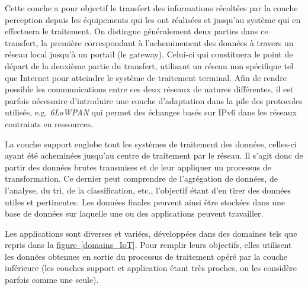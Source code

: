 \documentclass[]{article}
\newcommand{\minit}[1]{\noindent{\small\textbf{ \underline{#1}}}\vspace{0.2cm}}
\newcommand{\wordlink}[2]{\hyperref[#1]{#2~\ref{#1}}}
\begin{document}
Cette couche a pour objectif le transfert des informations récoltées par la couche perception depuis les équipements qui les ont réalisées et jusqu'au système qui en effectuera le traitement. On distingue généralement deux parties dans ce transfert, la première correspondant à l'acheminement des données à travers un réseau local jusqu'à un portail (le gateway). Celui-ci qui constituera le point de départ de la deuxième partie du transfert, utilisant un réseau non spécifique tel que Internet pour atteindre le système de traitement terminal. Afin de rendre possible les communications entre ces deux réseaux de natures différentes, il est parfois nécessaire d'introduire une couche d'adaptation dans la pile des protocoles utilisés, e.g. \textit{6LoWPAN} qui permet des échanges basés sur IPv6 dans les réseaux contraints en ressources.\\

\minit{La couche support}

La couche support englobe tout les systèmes de traitement des données, celles-ci ayant été acheminées jusqu'au centre de traitement par le réseau. Il s'agit donc de partir des données brutes transmises et de leur appliquer un processus de transformation. Ce dernier peut comprendre de l'agrégation de données, de l'analyse, du tri, de la classification, etc., l'objectif étant d'en tirer des données utiles et pertinentes. Les données finales peuvent ainsi être stockées dans une base de données sur laquelle une ou des applications peuvent travailler.\\

 
\minit{La couche application}

Les applications sont diverses et variées, développées dans des domaines tels que repris dans la \wordlink{domains_IoT}{figure}. Pour remplir leurs objectifs, elles utilisent les données obtenues en sortie du processus de traitement opéré par la couche inférieure (les couches support et application étant très proches, on les considère parfois comme une seule).
%
\end{document}
